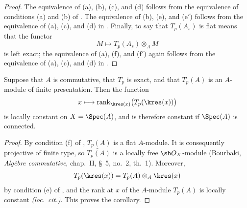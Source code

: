 \begin{proof}
The equivalence of (a), (b), (c), and (d) follows from the
equivalence of conditions (a) and (b) of .
The equivalence of (b), (e), and ($\mathrm{e}'$) follows from
the equivalence of (a), (c), and (d) in .
Finally, to say that $T_p(A_s)$ is flat means that the functor
\[
  M\longmapsto T_p(A_s)\otimes_A M
\]
is left exact; the equivalence of (a), (f), and
($\mathrm{f}'$) again follows from the equivalence of (a), (c),
and (d) in .
\end{proof}

\begin{corollary}[7.3.4]
\label{III.7.3.4}
Suppose that $A$ is commutative, that $T_p$ is exact, and that
$T_p(A)$ is an $A$-module of finite presentation.  Then the
function
\[
  x\longmapsto
  \operatorname{rank}_{\kres(x)}
  \bigl(T_p(\kres(x))\bigr)
\]
is locally constant on $X=\Spec(A)$, and is therefore constant
if $\Spec(A)$ is connected.
\end{corollary}

\begin{proof}
By condition (f) of , $T_p(A)$ is a flat
$A$-module.  It is consequently projective of finite type, so
$\widetilde{T_p(A)}$ is a locally free $\sh O_X$-module
(Bourbaki, \emph{Alg\`ebre commutative}, chap.~II, \S~5,
no.~2, th.~1).  Moreover,
\[
  T_p(\kres(x))
  =
  T_p(A)\otimes_A\kres(x)
\]
by condition (e) of , and the rank at $x$ of
the $A$-module $T_p(A)$ is locally constant
\emph{(loc.\ cit.)}.  This proves the corollary.
\end{proof}


